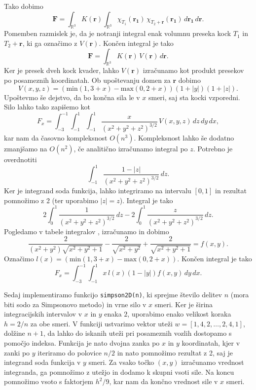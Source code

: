 \documentclass[11pt, titlepage]{article}
\begin{document}
Tako dobimo
$$
\mathbf{F} = \int_{\mathbb{R}^3} K(\mathbf{r}) \int_{\mathbb{R}^3} \chi_{T_1}(\mathbf{r_1}) \, \chi_{T_2 + \mathbf{r}}(\mathbf{r_1}) \, d\mathbf{r_1} \, d\mathbf{r}.
$$
Pomemben razmislek je, da je notranji integral enak volumnu preseka kock $T_1$ in $T_2 + \mathbf{r}$, ki ga označimo z $V(\mathbf{r})$. Končen integral je tako
$$
\mathbf{F} = \int_{\mathbb{R}^3} K(\mathbf{r}) \, V(\mathbf{r}) \, d\mathbf{r}.
$$
Ker je presek dveh kock kvader, lahko $V(\mathbf{r})$ izračunamo kot produkt presekov po posameznih koordinatah. Ob upoštevanju domen za $\mathbf{r}$ dobimo
$$
V(x,y,z) = \left(\text{min}(1,3+x) - \text{max}(0,2+x)\right)(1+|y|)(1+|z|).
$$
Upoštevmo še dejstvo, da bo končna sila le v $x$ smeri, saj sta kocki vzporedni. Silo lahko tako zapišemo kot
$$
F_x = \int_{-3}^{-1} \int_{-1}^{1} \int_{-1}^{1} \frac{x}{\left(x^2+y^2+z^2\right)^{3/2}} \, V(x,y,z) \, dz \, dy \, dx,
$$
kar nam da časovno kompleksnost $O(n^3)$. Kompleksnost lahko še dodatno zmanjšamo na $O(n^2)$, če analitično izračunamo integral po $z$. Potrebno je overdnotiti
$$
\int_{-1}^{1} \frac{1-|z|}{\left(x^2+y^2+z^2\right)^{3/2}} \, dz.
$$
Ker je integrand soda funkcija, lahko integriramo na intervalu $[0,1]$ in rezultat pomnožimo z 2 (ter uporabimo $|z| = z$). Integral je tako
$$
2\int_{0}^{1} \frac{1}{\left(x^2+y^2+z^2\right)^{3/2}} \, dz - 2\int_{0}^{1} \frac{z}{\left(x^2+y^2+z^2\right)^{3/2}} \, dz.
$$
Pogledamo v tabele integralov \cite{Bronštejn_Semendjaev_1984}, izračunamo in dobimo
$$
\frac{2}{(x^2+y^2)\sqrt{x^2+y^2+1}} - \frac{2}{\sqrt{x^2+y^2}} + \frac{2}{\sqrt{x^2+y^2+1}} = f(x,y).
$$
Označimo $l(x) = \left(\text{min}(1,3+x) - \text{max}(0,2+x)\right)$. Končen integral je tako
$$
F_x = \int_{-3}^{-1} \int_{-1}^{1} x \, l(x) (1-|y|) f(x,y) \, dy \, dx.
$$

Sedaj implementiramo funkcijo \texttt{simpson2D(n)}, ki sprejme število delitev $n$ (mora biti sodo za Simpsonovo metodo) in vrne silo v $x$ smeri. Ker je širina integracijskih intervalov v $x$ in $y$ enaka $2$, uporabimo enako velikost koraka $h = 2/n$ za obe smeri.
V funkciji ustvarimo vektor uteži $w = [1, 4, 2, \ldots, 2, 4, 1]$, dolžine $n+1$, da lahko do iskanih uteži pri posameznih vozlih dostopamo s pomočjo indeksa. Funkcija je nato dvojna zanka po $x$ in $y$ koordinatah, kjer v zanki po $y$ iteriramo do polovice $n/2$ in nato pomnožimo rezultat z 2, saj je integrand soda funkcija v $y$ smeri. 
Za vsako točko $(x,y)$ izračunamo vrednost integranda, ga pomnožimo z utežjo in dodamo k skupni vsoti sile. Na koncu pomnožimo vsoto s faktorjem $h^2/9$, kar nam da končno vrednost sile v $x$ smeri.
\end{document}

